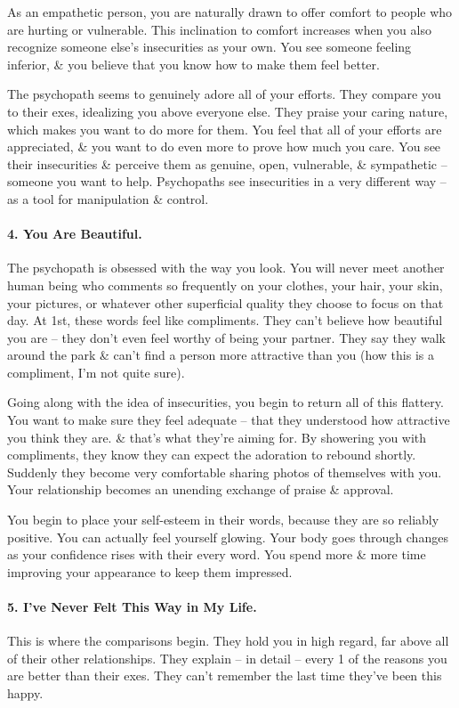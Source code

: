 \documentclass{article}
\numberwithin{equation}{section}
\begin{document}
As an empathetic person, you are naturally drawn to offer comfort to people who are hurting or vulnerable. This inclination to comfort increases when you also recognize someone else's insecurities as your own. You see someone feeling inferior, \& you believe that you know how to make them feel better.

The psychopath seems to genuinely adore all of your efforts. They compare you to their exes, idealizing you above everyone else. They praise your caring nature, which makes you want to do more for them. You feel that all of your efforts are appreciated, \& you want to do even more to prove how much you care. You see their insecurities \& perceive them as genuine, open, vulnerable, \& sympathetic -- someone you want to help. Psychopaths see insecurities in a very different way -- as a tool for manipulation \& control.

\paragraph{4. You Are Beautiful.} The psychopath is obsessed with the way you look. You will never meet another human being who comments so frequently on your clothes, your hair, your skin, your pictures, or whatever other superficial quality they choose to focus on that day. At 1st, these words feel like compliments. They can't believe how beautiful you are -- they don't even feel worthy of being your partner. They say they walk around the park \& can't find a person more attractive than you (how this is a compliment, I'm not quite sure).

Going along with the idea of insecurities, you begin to return all of this flattery. You want to make sure they feel adequate -- that they understood how attractive you think they are. \& that's what they're aiming for. By showering you with compliments, they know they can expect the adoration to rebound shortly. Suddenly they become very comfortable sharing photos of themselves with you. Your relationship becomes an unending exchange of praise \& approval.

You begin to place your self-esteem in their words, because they are so reliably positive. You can actually feel yourself glowing. Your body goes through changes as your confidence rises with their every word. You spend more \& more time improving your appearance to keep them impressed.

\paragraph{5. I've Never Felt This Way in My Life.} This is where the comparisons begin. They hold you in high regard, far above all of their other relationships. They explain -- in detail -- every 1 of the reasons you are better than their exes. They can't remember the last time they've been this happy.
\end{document}
